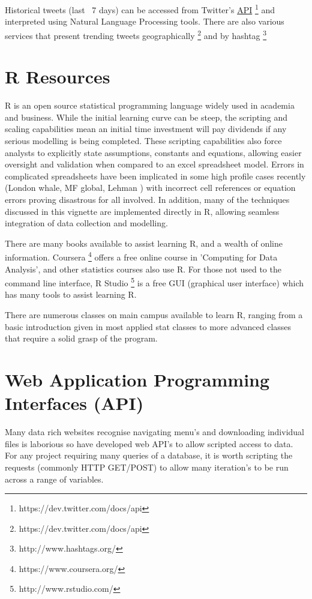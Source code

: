 \documentclass[11pt]{article}
\begin{document}
	Historical tweets (last ~7 days) can be accessed from Twitter's \hyperref[api]{API} \footnote{https://dev.twitter.com/docs/api} and interpreted using Natural Language Processing tools.
	There are also various services that present trending tweets geographically \footnote{https://dev.twitter.com/docs/api}  and by hashtag \footnote{http://www.hashtags.org/}


\newpage

\appendix
\appendixpage
\addappheadtotoc
	
\section{R Resources} \label{R}
	R is an open source statistical programming language widely used in academia and business.
	While the initial learning curve can be steep, the scripting and scaling capabilities mean an initial time investment will pay dividends if any serious modelling is being completed.
	These scripting capabilities also force analysts to explicitly state assumptions, constants and equations, allowing easier oversight and validation when compared to an excel spreadsheet model.
	Errors in complicated spreadsheets have been implicated in some high profile cases recently (London whale, MF global, Lehman \cite{excel13}) with incorrect cell references or equation errors proving disastrous for all involved. 
	In addition, many of the techniques discussed in this vignette are implemented directly in R, allowing seamless integration of data collection and modelling.


	There are many books available to assist learning R, and a wealth of online information.
	Coursera \footnote{https://www.coursera.org/} offers a free online course in 'Computing for Data Analysis', and other statistics courses also use R.
	For those not used to the command line interface, R Studio \footnote{http://www.rstudio.com/} is a free GUI (graphical user interface) which has many tools to assist learning R.

	There are numerous classes on main campus available to learn R, ranging from a basic introduction given in most applied stat classes to more advanced classes that require a solid grasp of the program.

	\section{Web Application Programming Interfaces (API)}\label{api}
	Many data rich websites recognise navigating menu's and downloading individual files is laborious so have developed web API's to allow scripted access to data.
	For any project requiring many queries of a database, it is worth scripting the requests (commonly HTTP GET/POST) to allow many iteration's to be run across a range of variables.
\end{document}
